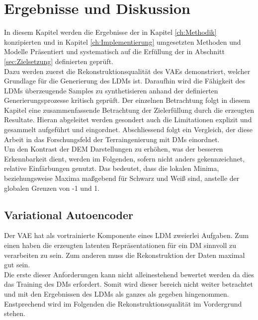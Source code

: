 \chapter{Ergebnisse und Diskussion}

In diesem Kapitel werden die Ergebnisse der in Kapitel \ref{ch:Methodik} konzipierten und in Kapitel \ref{ch:Implementierung} umgesetzten Methoden und Modelle Präsentiert und systematisch auf die Erfüllung der in Abschnitt \ref{sec:Zielsetzung} definierten geprüft. \\
Dazu werden zuerst die Rekonstruktionsqualität des VAEs demonstriert, welcher Grundlage für die Generierung des LDMs ist. Daraufhin wird die Fähigkeit des LDMs überzeugende Samples zu synthetisieren anhand der definierten Generierungsprozesse kritisch geprüft. Der einzelnen Betrachtung folgt in diesem Kapitel eine zusammenfassende Betrachtung der Zielerfüllung durch die erzeugten Resultate. Hieran abgeleitet werden gesondert auch die Limitationen explizit und gesammelt aufgeführt und eingordnet. Abschliessend folgt ein Vergleich, der diese Arbeit in das Forschungsfeld der Terraingenierung mit DMs einordnet. \\
Um den Kontrast der DEM Darstellungen zu erhöhen, was der besseren Erkennbarkeit dient, werden im Folgenden, sofern nicht anders gekennzeichnet, relative Einfärbungen genutzt. Das bedeutet, dass die lokalen Minima, beziehungsweise Maxima maßgebend für Schwarz und Weiß sind, anstelle der globalen Grenzen von -1 und 1.  

\section {Variational Autoencoder}

Der VAE hat als vortrainierte Komponente eines LDM zweierlei Aufgaben. Zum einen haben die erzeugten latenten Repräsentationen für ein DM sinnvoll zu verarbeiten zu sein. Zum anderen muss die Rekonstruktion der Daten maximal gut sein. \\
Die erste dieser Anforderungen kann nicht alleinestehend bewertet werden da dies das Training des DMs erfordert. Somit wird dieser bereich nicht weiter betrachtet und mit den Ergebnissen des LDMs als ganzes als gegeben hingenommen. Enstprechend wird im Folgenden die Rekonstruktionsqualität im Vordergrund stehen. 





